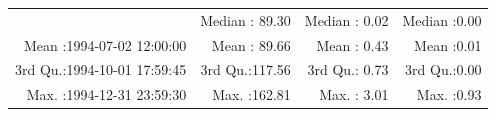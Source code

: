 \documentclass[
  10pt,
  a4paper,oneside]{article}
\begin{document}
\begin{longtable}[]{@{}rrrr@{}}
\begin{minipage}[t]{0.34\columnwidth}
\end{minipage} & \begin{minipage}[t]{0.19\columnwidth}\raggedleft
Median : 89.30\strut
\end{minipage} & \begin{minipage}[t]{0.18\columnwidth}\raggedleft
Median : 0.02\strut
\end{minipage} & \begin{minipage}[t]{0.18\columnwidth}\raggedleft
Median :0.00\strut
\end{minipage}\tabularnewline
\begin{minipage}[t]{0.34\columnwidth}\raggedleft
Mean :1994-07-02 12:00:00\strut
\end{minipage} & \begin{minipage}[t]{0.19\columnwidth}\raggedleft
Mean : 89.66\strut
\end{minipage} & \begin{minipage}[t]{0.18\columnwidth}\raggedleft
Mean : 0.43\strut
\end{minipage} & \begin{minipage}[t]{0.18\columnwidth}\raggedleft
Mean :0.01\strut
\end{minipage}\tabularnewline
\begin{minipage}[t]{0.34\columnwidth}\raggedleft
3rd Qu.:1994-10-01 17:59:45\strut
\end{minipage} & \begin{minipage}[t]{0.19\columnwidth}\raggedleft
3rd Qu.:117.56\strut
\end{minipage} & \begin{minipage}[t]{0.18\columnwidth}\raggedleft
3rd Qu.: 0.73\strut
\end{minipage} & \begin{minipage}[t]{0.18\columnwidth}\raggedleft
3rd Qu.:0.00\strut
\end{minipage}\tabularnewline
\begin{minipage}[t]{0.34\columnwidth}\raggedleft
Max. :1994-12-31 23:59:30\strut
\end{minipage} & \begin{minipage}[t]{0.19\columnwidth}\raggedleft
Max. :162.81\strut
\end{minipage} & \begin{minipage}[t]{0.18\columnwidth}\raggedleft
Max. : 3.01\strut
\end{minipage} & \begin{minipage}[t]{0.18\columnwidth}\raggedleft
Max. :0.93\strut
\end{minipage}\tabularnewline

\end{longtable}
\end{document}
